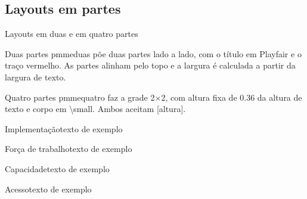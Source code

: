 \documentclass[aspectratio=169,10pt]{beamer}
\newcommand{\cod}[1]{{\ttfamily\fontsize{6.4}{7.6}\selectfont\color{insperCinza}#1}}
\begin{document}
\subsection{Layouts em partes}
\begin{frame}{Layouts em duas e em quatro partes}
  \begin{pmmeduas}
    \begin{pmmeparte}{Duas partes}
      \footnotesize \cod{pmmeduas} põe duas partes lado a lado, com o título
      em Playfair e o traço vermelho. As partes alinham pelo topo e a largura
      é calculada a partir da largura de texto.
    \end{pmmeparte}
    \begin{pmmeparte}{Quatro partes}
      \footnotesize \cod{pmmequatro} faz a grade 2$\times$2, com altura fixa
      de \num{0,36} da altura de texto e corpo em \cod{\textbackslash small}.
      Ambos aceitam \cod{[altura]}.
    \end{pmmeparte}
  \end{pmmeduas}

  \vspace{1.0em}
  \begin{pmmequatro}[0.2\textheight]
    \begin{pmmeparte}{Implementação}\footnotesize texto de exemplo\end{pmmeparte}
    \begin{pmmeparte}{Força de trabalho}\footnotesize texto de exemplo\end{pmmeparte}
    \begin{pmmeparte}{Capacidade}\footnotesize texto de exemplo\end{pmmeparte}
    \begin{pmmeparte}{Acesso}\footnotesize texto de exemplo\end{pmmeparte}
  \end{pmmequatro}
\end{frame}
\end{document}
